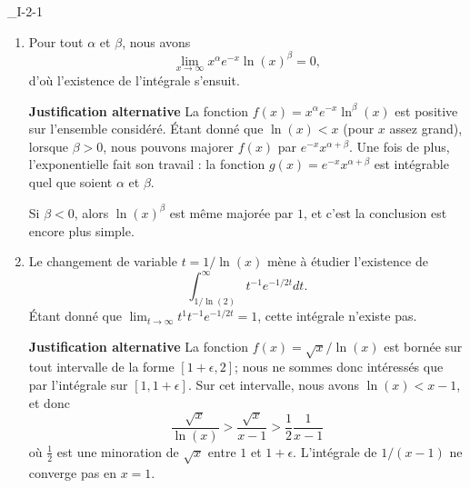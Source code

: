 \begin{corrige}{_I-2-1}
\begin{enumerate}
{\bf Justification alternative} Sans perte de généralité, nous pouvons supposer que $P(x)$ est positif. En effet, pour $x$ assez grand, un polynôme ne change plus de signe, et nous pouvons éventuellement considérer $-P(x)$ au lieu de $P(x)$. Soit $Q$, un polynôme de degré deux plus haut que $P$, que nous prenons positif. Une propriété de l'exponentielle est que $\exists x_0>0$ tel que $x>x_0$ implique $ e^{-x^2}>Q(x)$ et $Q(x)>P(x)$, et donc
\begin{equation}
	\frac{ P(x) }{ Q(x) }>P(x) e^{-x^2}
\end{equation}
pour $x>x_0$. Mais, la fraction rationnelle $P/Q$ est intégrable sur $[x_0,\infty[$ parce qu'elle peut être majoré par une fonction de la forme $a/x^2$, comme dans l'exercice \ref{ExoPointPremierIdeuxUn}. Le théorème \ref{ThoFnTestIntnnBorn} conclu à l'intégrabilité de $f$ sur $[0,\infty[$.

\item

Pour tout $\alpha$ et $\beta$, nous avons
\begin{equation}
	\lim_{x\to\infty}x^{\alpha} e^{-x}\ln(x)^{\beta}=0,
\end{equation}
d'où l'existence de l'intégrale s'ensuit.

{\bf Justification alternative}
 La fonction $f(x)=x^{\alpha} e^{-x}\ln^{\beta}(x)$ est positive sur l'ensemble considéré. Étant donné que $\ln(x)<x$ (pour $x$ assez grand), lorsque $\beta>0$, nous pouvons majorer $f(x)$ par $ e^{-x}x^{\alpha+\beta}$. Une fois de plus, l'exponentielle fait son travail : la fonction $g(x)= e^{-x}x^{\alpha+\beta}$ est intégrable quel que soient $\alpha$ et $\beta$.

Si $\beta<0$, alors $\ln(x)^{\beta}$ est même majorée par $1$, et c'est la conclusion est encore plus simple.

\item\label{ItemDCorrI21}

Le changement de variable $t=1/\ln(x)$ mène à étudier l'existence de
\begin{equation}
	\int_{1/\ln(2)}^{\infty}t^{-1} e^{-1/2t}dt.
\end{equation}
Étant donné que $\lim_{t\to \infty}t^1t^{-1} e^{-1/2t}=1$, cette intégrale n'existe pas.

{\bf Justification alternative}
 La fonction $f(x)=\sqrt{x}/\ln(x)$ est bornée sur tout intervalle de la forme $[1+\epsilon,2]$; nous ne sommes donc intéressés que par l'intégrale sur $[1,1+\epsilon]$. Sur cet intervalle, nous avons $\ln(x)<x-1$, et donc 
\begin{equation}
	\frac{ \sqrt{x} }{ \ln(x) }>\frac{ \sqrt{x} }{ x-1 }>\frac{ 1 }{ 2 }\frac{ 1 }{ x-1 }
\end{equation}
où $\frac{ 1 }{2}$ est une minoration de $\sqrt{x}$ entre $1$ et $1+\epsilon$. L'intégrale de $1/(x-1)$ ne converge pas en $x=1$.


\end{enumerate}
\end{corrige}
